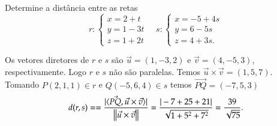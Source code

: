 \begin{exemplo}
    Determine a dist\^ancia entre as retas
    \[
        r: \begin{cases}
            x = 2 + t\\
            y = 1 - 3t\\
            z = 1 + 2t
        \end{cases} \quad s: \begin{cases}
            x = -5 + 4s\\
            y = 6 - 5s\\
            z = 4 + 3s.
        \end{cases}
    \]
    \begin{solucao}
        Os vetores diretores de $r$ e $s$ s\~ao $\vec{u} = (1,-3,2)$ e $\vec{v} = (4,-5,3)$, respectivamente. Logo $r$ e $s$ n\~ao s\~ao paralelas. 
        Temos $\vec{u}\times\vec{v} = (1,5,7)$. Tomando $P(2,1,1) \in r$ e $Q(-5,6,4) \in s$ temos $\vec{PQ} = (-7,5,3)$
        \[
            d(r,s) = = \dfrac{|\langle\vec{PQ},\vec{u}\times\vec{v}\rangle|}{\left\Vert{\vec{u}\times\vec{v}}\right\Vert} = \dfrac{|-7+25+21|}{\sqrt{1 + 5^2 + 7^2}} = \dfrac{39}{\sqrt{75}}.
        \]


    \end{solucao}
\end{exemplo}

